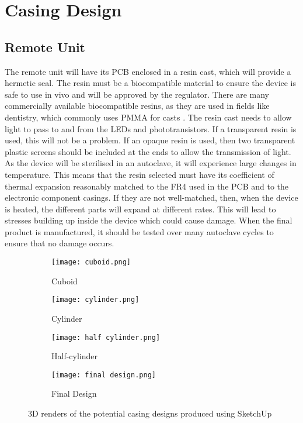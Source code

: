 \section{Casing Design}

\subsection{Remote Unit}
The remote unit will have its PCB enclosed in a resin cast, which will provide a hermetic seal. The resin must be a biocompatible material to ensure the device is safe to use in vivo and will be approved by the regulator. There are many commercially available biocompatible resins, as they are used in fields like dentistry, which commonly uses PMMA for casts \cite{biocompatible_resin}. The resin cast needs to allow light to pass to and from the LEDs and phototransistors. If a transparent resin is used, this will not be a problem. If an opaque resin is used, then two transparent plastic screens should be included at the ends to allow the transmission of light.\\

As the device will be sterilised in an autoclave, it will experience large changes in temperature. This means that the resin selected must have its coefficient of thermal expansion reasonably matched to the FR4 used in the PCB and to the electronic component casings. If they are not well-matched, then, when the device is heated, the different parts will expand at different rates. This will lead to stresses building up inside the device which could cause damage. When the final product is manufactured, it should be tested over many autoclave cycles to ensure that no damage occurs.\\

\begin{figure}[htb]
	\centering
	\begin{subfigure}[b]{0.4\linewidth}
		\texttt{[image: cuboid.png]}
		\caption{Cuboid}
		\label{fig: cuboid}
	\end{subfigure}
	\begin{subfigure}[b]{0.4\linewidth}
		\texttt{[image: cylinder.png]}
		\caption{Cylinder}
		\label{fig: cylinder}
	\end{subfigure}
	\begin{subfigure}[b]{0.4\linewidth}
		\texttt{[image: half cylinder.png]}
		\caption{Half-cylinder}
		\label{fig: half-cylinder}
	\end{subfigure}
	\begin{subfigure}[b]{0.4\linewidth}
		\texttt{[image: final design.png]}
		\caption{Final Design}
		\label{fig: final design}
	\end{subfigure}
	\caption{3D renders of the potential casing designs produced using SketchUp \cite{sketchup}}
	\label{fig: casings}
\end{figure}

